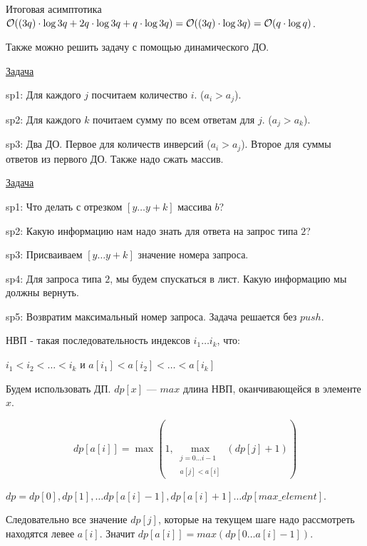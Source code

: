 Итоговая асимптотика $\mathcal{O}((3q) \cdot \log 3q + 2q \cdot \log 3q + q \cdot \log 3q) = \mathcal{O}((3q) \cdot \log 3q) = \mathcal{O}(q \cdot \log q)$.

Также можно решить задачу с помощью динамического ДО.


\href{https://codeforces.com/contest/61/problem/E}{Задача}
\href{https://codeforces.com/contest/61/submission/124484488}{}

sp1: Для каждого $j$ посчитаем количество $i$. ($a_i > a_j$).

sp2: Для каждого $k$ почитаем сумму по всем ответам для $j$. ($a_j > a_k$).

sp3: Два ДО. Первое для количеств инверсий ($a_i > a_j$). Второе для суммы ответов из первого ДО. Также надо сжать массив.


\href{https://codeforces.com/contest/292/problem/E}{Задача}
\href{https://codeforces.com/contest/292/submission/124450504}{}

sp1: Что делать с отрезком $[y \dots y + k]$ массива $b$?

sp2: Какую информацию нам надо знать для ответа на запрос типа $2$?

sp3: Присваиваем $[y \dots y + k]$ значение номера запроса.

sp4: Для запроса типа $2$, мы будем спускаться в лист. Какую информацию мы должны вернуть.

sp5: Возвратим максимальный номер запроса. Задача решается без $push$.


НВП - такая последовательность индексов $i_1 \ldots i_k$, что: 

$i_1 < i_2 < \dots < i_k$ и $a[i_1] < a[i_2] < \dots < a[i_k]$

\down

Будем использовать ДП. $dp[x]$ --- $max$ длина НВП, оканчивающейся в элементе $x$.

$$dp[a[i]] = \max\left(1, \max_{\substack{j = 0 \dots i-1 \\\\ a[j] < a[i]}} \left(dp[j] + 1\right)\right)$$

$dp = {dp[0], dp[1], \ldots dp[a[i] - 1], dp[a[i] + 1] \ldots dp[max\_element]}$.

Следовательно все значение $dp[j]$, которые на текущем шаге надо рассмотреть находятся левее $a[i]$. Значит $dp[a[i]] = max(dp[0 \ldots a[i] - 1])$.

